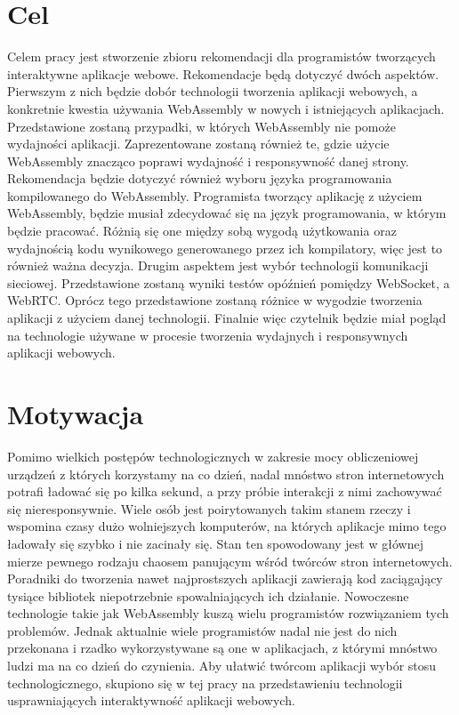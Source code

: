 \documentclass[language=polish,type=master]{aghmodern}
\begin{document}
\section{Cel}
Celem pracy jest stworzenie zbioru rekomendacji dla programistów tworzących interaktywne aplikacje webowe.
Rekomendacje będą dotyczyć dwóch aspektów.
Pierwszym z nich będzie dobór technologii tworzenia aplikacji webowych, a konkretnie kwestia używania WebAssembly w nowych i istniejących aplikacjach.
Przedstawione zostaną przypadki, w których WebAssembly nie pomoże wydajności aplikacji.
Zaprezentowane zostaną również te, gdzie użycie WebAssembly znacząco poprawi wydajność i responsywność danej strony.
Rekomendacja będzie dotyczyć również wyboru języka programowania kompilowanego do WebAssembly.
Programista tworzący aplikację z użyciem WebAssembly, będzie musiał zdecydować się na język programowania, w którym będzie pracować.
Różnią się one między sobą wygodą użytkowania oraz wydajnością kodu wynikowego generowanego przez ich kompilatory, więc jest to również ważna decyzja.
Drugim aspektem jest wybór technologii komunikacji sieciowej.
Przedstawione zostaną wyniki testów opóźnień pomiędzy WebSocket, a WebRTC.
Oprócz tego przedstawione zostaną różnice w wygodzie tworzenia aplikacji z użyciem danej technologii.
Finalnie więc czytelnik będzie miał pogląd na technologie używane w procesie tworzenia wydajnych i responsywnych aplikacji webowych.

\section{Motywacja}
Pomimo wielkich postępów technologicznych w zakresie mocy obliczeniowej urządzeń z których korzystamy na co dzień, nadal mnóstwo stron internetowych potrafi ładować się po kilka sekund, a przy próbie interakcji z nimi zachowywać się nieresponsywnie.
Wiele osób jest poirytowanych takim stanem rzeczy i wspomina czasy dużo wolniejszych komputerów, na których aplikacje mimo tego ładowały się szybko i nie zacinały się.
Stan ten spowodowany jest w głównej mierze pewnego rodzaju chaosem panującym wśród twórców stron internetowych.
Poradniki do tworzenia nawet najprostszych aplikacji zawierają kod zaciągający tysiące bibliotek niepotrzebnie spowalniających ich działanie.
Nowoczesne technologie takie jak WebAssembly kuszą wielu programistów rozwiązaniem tych problemów.
Jednak aktualnie wiele programistów nadal nie jest do nich przekonana i rzadko wykorzystywane są one w aplikacjach, z którymi mnóstwo ludzi ma na co dzień do czynienia.
Aby ułatwić twórcom aplikacji wybór stosu technologicznego, skupiono się w tej pracy na przedstawieniu technologii usprawniających interaktywność aplikacji webowych.
\end{document}
